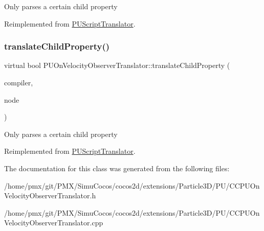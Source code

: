 Only parses a certain child property 

Reimplemented from \hyperlink{classPUScriptTranslator_a0374d83a8a04e57918975d525e0f8fe8}{P\+U\+Script\+Translator}.

\mbox{\label{classPUOnVelocityObserverTranslator_ad7b680fc8d51b8f40f6412ec38cfcb1e}} 
\subsubsection{\texorpdfstring{translate\+Child\+Property()}{translateChildProperty()}\hspace{0.1cm}{\footnotesize\ttfamily [2/2]}}
{\footnotesize\ttfamily virtual bool P\+U\+On\+Velocity\+Observer\+Translator\+::translate\+Child\+Property (\begin{DoxyParamCaption}\item[{\hyperlink{classPUScriptCompiler}{P\+U\+Script\+Compiler} $\ast$}]{compiler,  }\item[{\hyperlink{classPUAbstractNode}{P\+U\+Abstract\+Node} $\ast$}]{node }\end{DoxyParamCaption})\hspace{0.3cm}{\ttfamily [virtual]}}

Only parses a certain child property 

Reimplemented from \hyperlink{classPUScriptTranslator_a0374d83a8a04e57918975d525e0f8fe8}{P\+U\+Script\+Translator}.



The documentation for this class was generated from the following files\+:\begin{DoxyCompactItemize}
\item 
/home/pmx/git/\+P\+M\+X/\+Simu\+Cocos/cocos2d/extensions/\+Particle3\+D/\+P\+U/C\+C\+P\+U\+On\+Velocity\+Observer\+Translator.\+h\item 
/home/pmx/git/\+P\+M\+X/\+Simu\+Cocos/cocos2d/extensions/\+Particle3\+D/\+P\+U/C\+C\+P\+U\+On\+Velocity\+Observer\+Translator.\+cpp\end{DoxyCompactItemize}
